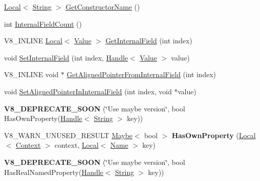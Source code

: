 \begin{DoxyCompactItemize}
\item 
\hyperlink{classv8_1_1_local}{Local}$<$ \hyperlink{classv8_1_1_string}{String} $>$ \hyperlink{classv8_1_1_object_a7bbe987794658f20a3ec1b68326305e6}{Get\+Constructor\+Name} ()
\item 
int \hyperlink{classv8_1_1_object_aaec28576353eebe6fee113bce2718ecc}{Internal\+Field\+Count} ()
\item 
V8\+\_\+\+I\+N\+L\+I\+N\+E \hyperlink{classv8_1_1_local}{Local}$<$ \hyperlink{classv8_1_1_value}{Value} $>$ \hyperlink{classv8_1_1_object_aa3324fdf652d8ac3b2f27faa0559231d}{Get\+Internal\+Field} (int index)
\item 
void \hyperlink{classv8_1_1_object_a361b1781e7db29b17b063ef31315989e}{Set\+Internal\+Field} (int index, \hyperlink{classv8_1_1_local}{Handle}$<$ \hyperlink{classv8_1_1_value}{Value} $>$ value)
\item 
V8\+\_\+\+I\+N\+L\+I\+N\+E void $\ast$ \hyperlink{classv8_1_1_object_a435f68bb7ef0f64dd522c5c910682448}{Get\+Aligned\+Pointer\+From\+Internal\+Field} (int index)
\item 
void \hyperlink{classv8_1_1_object_a0ccba69581f0b5e4e672bab90f26879b}{Set\+Aligned\+Pointer\+In\+Internal\+Field} (int index, void $\ast$value)
\item 
\hypertarget{classv8_1_1_object_aa38f3a094641bb41a3461498cf6d8b8e}{}{\bfseries V8\+\_\+\+D\+E\+P\+R\+E\+C\+A\+T\+E\+\_\+\+S\+O\+O\+N} (\char`\"{}Use maybe version\char`\"{}, bool Has\+Own\+Property(\hyperlink{classv8_1_1_local}{Handle}$<$ \hyperlink{classv8_1_1_string}{String} $>$ key))\label{classv8_1_1_object_aa38f3a094641bb41a3461498cf6d8b8e}

\item 
\hypertarget{classv8_1_1_object_acdd3921e95d5bb1a27cea489792607ff}{}V8\+\_\+\+W\+A\+R\+N\+\_\+\+U\+N\+U\+S\+E\+D\+\_\+\+R\+E\+S\+U\+L\+T \hyperlink{classv8_1_1_maybe}{Maybe}$<$ bool $>$ {\bfseries Has\+Own\+Property} (\hyperlink{classv8_1_1_local}{Local}$<$ \hyperlink{classv8_1_1_context}{Context} $>$ context, \hyperlink{classv8_1_1_local}{Local}$<$ \hyperlink{classv8_1_1_name}{Name} $>$ key)\label{classv8_1_1_object_acdd3921e95d5bb1a27cea489792607ff}

\item 
\hypertarget{classv8_1_1_object_a38702fa522e650514f8831f2eb4a9a4c}{}{\bfseries V8\+\_\+\+D\+E\+P\+R\+E\+C\+A\+T\+E\+\_\+\+S\+O\+O\+N} (\char`\"{}Use maybe version\char`\"{}, bool Has\+Real\+Named\+Property(\hyperlink{classv8_1_1_local}{Handle}$<$ \hyperlink{classv8_1_1_string}{String} $>$ key))\label{classv8_1_1_object_a38702fa522e650514f8831f2eb4a9a4c}


\end{DoxyCompactItemize}
